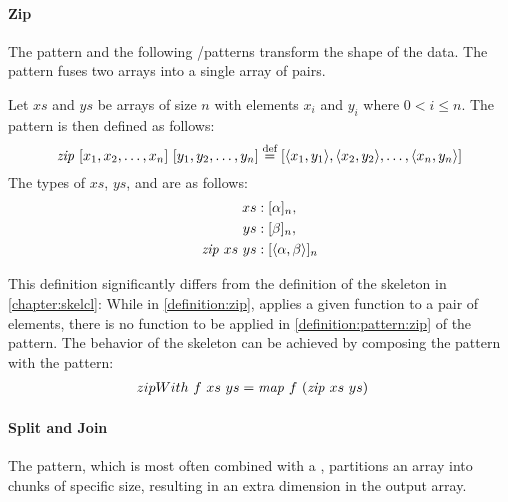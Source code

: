 \paragraph{Zip}
The \zip pattern and the following \splitN/\join patterns transform the shape of the data. %
The \zip pattern fuses two arrays into a single array of pairs.

\begin{definition}
  \label{definition:pattern:zip}
  Let $xs$ and $ys$ be arrays of size $n$ with elements $x_i$ and $y_i$ where $0 < i \leq n$.
  The \zip pattern is then defined as follows:
  \begin{equation*}
    \text{\textit{zip}}\ [x_1, x_2, \dots, x_n]\ [y_1, y_2, \dots, y_n]\\
      \stackrel{\textrm{\scriptsize def}}{=} [\langle x_1, y_1\rangle, \langle x_2, y_2\rangle, \dots, \langle x_n, y_n\rangle]
  \end{equation*}
  The types of $xs$, $ys$, and \zip are as follows:
  \begin{align*}
    xs &: [\alpha]_n,\\
    ys &: [\beta]_n,\\
    \text{\textit{zip}}\ xs\ ys &: [\langle\alpha, \beta\rangle]_n
  \end{align*}
\end{definition}

\noindent
This definition significantly differs from the definition of the \zip skeleton in \autoref{chapter:skelcl}:
While in \autoref{definition:zip}, \zip applies a given function to a pair of elements, there is no function to be applied in \autoref{definition:pattern:zip} of the \zip pattern.
The behavior of the \zip skeleton can be achieved by composing the \zip pattern with the \map pattern:
\begin{align*}
  zipWith\ f\ xs\ ys &= \text{\textit{map}}\ f\ (\text{\textit{zip}}\ xs\ ys)
\end{align*}


\paragraph{Split and Join}
The \splitN pattern, which is most often combined with a \join, partitions an array into chunks of specific size, resulting in an extra dimension in the output array.


